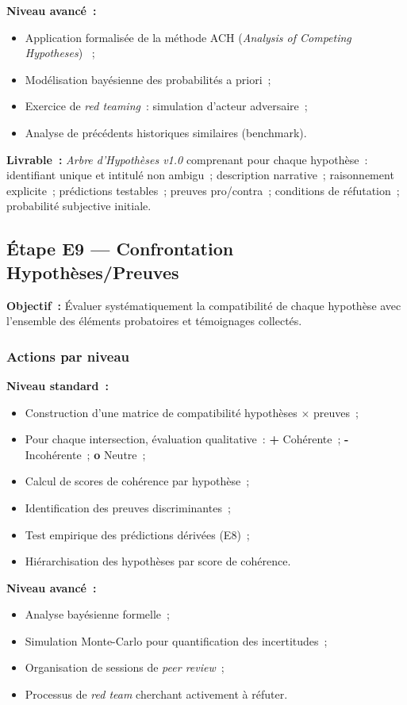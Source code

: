 \textbf{Niveau avancé~:}
\begin{itemize}
    \item Application formalisée de la méthode ACH
          (\textit{Analysis of Competing Hypotheses}) \cite{heuer1999}~;
    \item Modélisation bayésienne des probabilités a priori~;
    \item Exercice de \textit{red teaming}~: simulation d'acteur adversaire~;
    \item Analyse de précédents historiques similaires (benchmark).
\end{itemize}

\textbf{Livrable~:} \textit{Arbre d'Hypothèses v1.0} comprenant pour chaque
hypothèse~: identifiant unique et intitulé non ambigu~; description narrative~;
raisonnement explicite~; prédictions testables~; preuves pro/contra~;
conditions de réfutation~; probabilité subjective initiale.

\subsection{Étape E9 --- Confrontation Hypothèses/Preuves}

\textbf{Objectif~:} Évaluer systématiquement la compatibilité de chaque hypothèse
avec l'ensemble des éléments probatoires et témoignages collectés.

\subsubsection*{Actions par niveau}

\textbf{Niveau standard~:}
\begin{itemize}
    \item Construction d'une matrice de compatibilité hypothèses $\times$ preuves~;
    \item Pour chaque intersection, évaluation qualitative~:
          \textbf{+} Cohérente~; \textbf{-} Incohérente~; \textbf{o} Neutre~;
    \item Calcul de scores de cohérence par hypothèse~;
    \item Identification des preuves discriminantes~;
    \item Test empirique des prédictions dérivées (E8)~;
    \item Hiérarchisation des hypothèses par score de cohérence.
\end{itemize}

\textbf{Niveau avancé~:}
\begin{itemize}
    \item Analyse bayésienne formelle~;
    \item Simulation Monte-Carlo pour quantification des incertitudes~;
    \item Organisation de sessions de \textit{peer review}~;
    \item Processus de \textit{red team} cherchant activement à réfuter.
\end{itemize}


